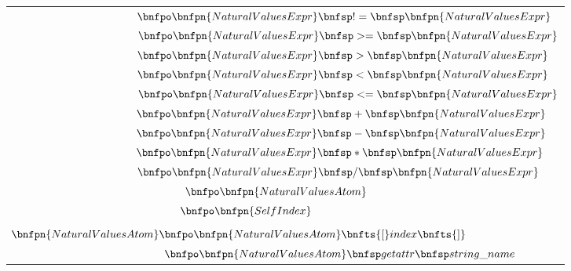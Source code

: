 \begin{longtable}{  c  }
    $\hspace{3.8cm} \bnfpo \bnfpn{NaturalValuesExpr} \bnfsp != \bnfsp \bnfpn{NaturalValuesExpr}$                                 \\
    $\hspace{4cm} \bnfpo \bnfpn{NaturalValuesExpr} \bnfsp >= \bnfsp \bnfpn{NaturalValuesExpr}$                                 \\
    $\hspace{3.7cm} \bnfpo \bnfpn{NaturalValuesExpr} \bnfsp > \bnfsp \bnfpn{NaturalValuesExpr}$                                  \\
    $\hspace{3.7cm} \bnfpo \bnfpn{NaturalValuesExpr} \bnfsp < \bnfsp \bnfpn{NaturalValuesExpr}$                                  \\
    $\hspace{4cm} \bnfpo \bnfpn{NaturalValuesExpr} \bnfsp <= \bnfsp \bnfpn{NaturalValuesExpr}$                                 \\
    $\hspace{3.6cm} \bnfpo \bnfpn{NaturalValuesExpr} \bnfsp + \bnfsp \bnfpn{NaturalValuesExpr}$                                  \\
    $\hspace{3.6cm} \bnfpo \bnfpn{NaturalValuesExpr} \bnfsp - \bnfsp \bnfpn{NaturalValuesExpr}$                                  \\
    $\hspace{3.5cm} \bnfpo \bnfpn{NaturalValuesExpr} \bnfsp * \bnfsp \bnfpn{NaturalValuesExpr}$                                  \\
    $\hspace{3.4cm} \bnfpo \bnfpn{NaturalValuesExpr} \bnfsp / \bnfsp \bnfpn{NaturalValuesExpr}$                                  \\
    $\hspace{-0.6cm} \bnfpo \bnfpn{NaturalValuesAtom}$                                                                            \\
    $\hspace{-2.5cm} \bnfpo \bnfpn{SelfIndex}$                                                                                   \\
    \\
    $\hspace{-3cm}\bnfpn{NaturalValuesAtom} \bnfpo \bnfpn{NaturalValuesAtom}\bnfts{[}index\bnfts{]} $                          \\
    $\hspace{3.5cm}\bnfpo \bnfpn{NaturalValuesAtom}\bnfsp getattr\bnfsp string\_name $                                           \\

\end{longtable}
